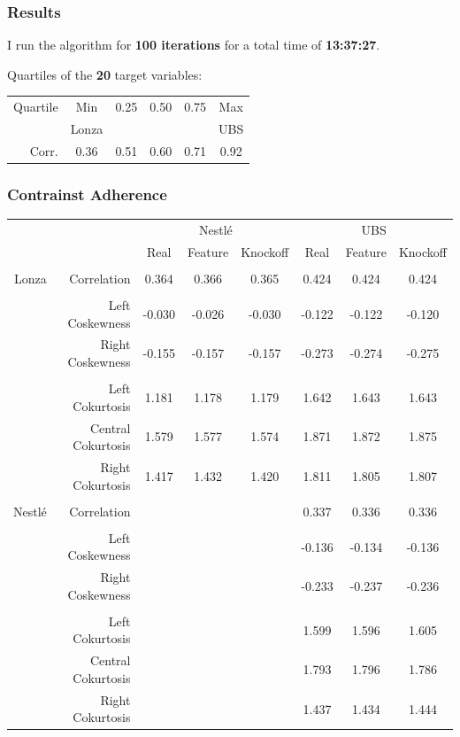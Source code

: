 \documentclass[
	11pt, %
]{beamer}
\begin{document}
\begin{frame}
	\frametitle{Results}
	I run the algorithm for \textbf{100 iterations} for a total time of \textbf{13:37:27}.
	
	\bigskip
	
	Quartiles of the \textbf{20} target variables:
	
	\bigskip
	
	\begin{center}
		\begin{tabular}{r | c c c c c}
			Quartile & Min & 0.25 & 0.50 & 0.75 & Max \\
			& Lonza &&&& UBS \\
			\hline
			Corr. & 0.36 & 0.51 & 0.60 & 0.71 & 0.92
		\end{tabular}
	\end{center}
\end{frame}

\begin{frame}
	\frametitle{Contrainst Adherence}
	\begin{table}
		\centering
		\tiny
		\begin{tabular}{r r | c | c c || c | c c}
			& & \multicolumn{3}{c}{Nestl\'{e}} & \multicolumn{3}{c}{UBS} \\
			& & Real & Feature & Knockoff & Real & Feature & Knockoff \\
			\hline
			&&&&&&& \\
			Lonza & Correlation & 0.364 & 0.366 & 0.365 & 0.424 & 0.424 & 0.424 \\
			\hline
			&&&&&&& \\
			& Left Coskewness & -0.030 & -0.026 & -0.030 & -0.122 & -0.122 & -0.120 \\
			& Right Coskewness & -0.155 & -0.157 & -0.157 & -0.273 & -0.274 & -0.275 \\
			\hline
			&&&&&&& \\
			& Left Cokurtosis & 1.181 & 1.178 & 1.179 & 1.642 & 1.643 & 1.643 \\
			& Central Cokurtosis & 1.579 & 1.577 & 1.574 & 1.871 & 1.872 & 1.875 \\
			& Right Cokurtosis & 1.417 & 1.432 & 1.420 & 1.811 & 1.805 & 1.807 \\
			\hline
			\hline
			&&&&&&& \\
			Nestl\'{e} & Correlation & & & & 0.337 & 0.336 & 0.336 \\
			\hline
			&&&&&&& \\
			& Left Coskewness & & & & -0.136 & -0.134 & -0.136 \\
			& Right Coskewness & & & & -0.233 & -0.237 & -0.236 \\
			\hline
			&&&&&&& \\
			& Left Cokurtosis & & & & 1.599 & 1.596 & 1.605 \\
			& Central Cokurtosis & & & & 1.793 & 1.796 & 1.786 \\
			& Right Cokurtosis & & & & 1.437 & 1.434 & 1.444 \\
		\end{tabular}
	\end{table}
\end{frame}
\end{document}
